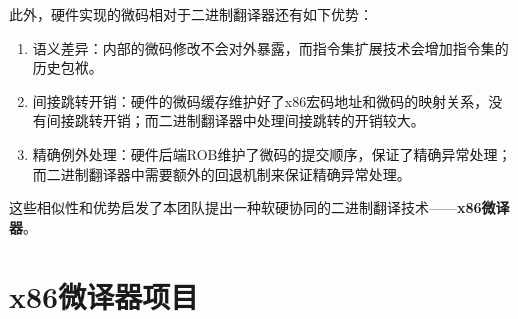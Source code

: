 此外，硬件实现的微码相对于二进制翻译器还有如下优势：

\begin{enumerate}
\item 语义差异：内部的微码修改不会对外暴露，而指令集扩展技术会增加指令集的历史包袱。
\item 间接跳转开销：硬件的微码缓存维护好了x86宏码地址和微码的映射关系，没有间接跳转开销；而二进制翻译器中处理间接跳转的开销较大。
\item 精确例外处理：硬件后端ROB维护了微码的提交顺序，保证了精确异常处理；而二进制翻译器中需要额外的回退机制来保证精确异常处理。
\end{enumerate}

这些相似性和优势启发了本团队提出一种软硬协同的二进制翻译技术——\textbf{x86微译器}。

\section{x86微译器项目}\label{chap:MUT}





